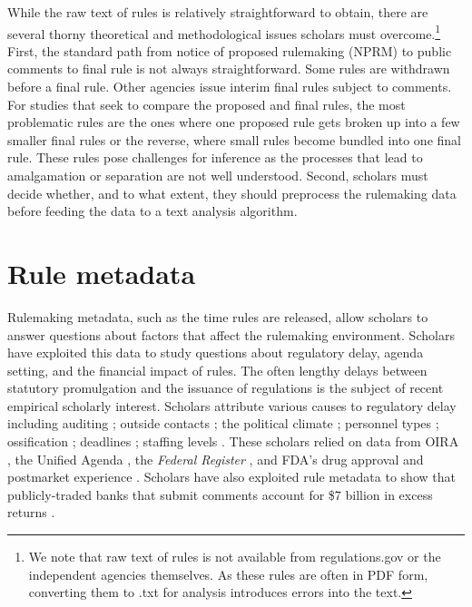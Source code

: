 \documentclass[12pt,notitlepage]{article}
\begin{document}
While the raw text of rules is relatively straightforward to obtain,
there are several thorny theoretical and methodological issues scholars
must overcome.\footnote{We note that raw text of rules is not available
  from regulations.gov or the independent agencies themselves. As these
  rules are often in PDF form, converting them to .txt for analysis
  introduces errors into the text.} First, the standard path from notice
of proposed rulemaking (NPRM) to public comments to final rule is not
always straightforward. Some rules are withdrawn before a final rule.
Other agencies issue interim final rules subject to comments. For
studies that seek to compare the proposed and final rules, the most
problematic rules are the ones where one proposed rule gets broken up
into a few smaller final rules or the reverse, where small rules become
bundled into one final rule. These rules pose challenges for inference
as the processes that lead to amalgamation or separation are not well
understood. Second, scholars must decide whether, and to what extent,
they should preprocess the rulemaking data before feeding the data to a
text analysis algorithm.

\hypertarget{rule-metadata}{%
\section{Rule metadata}\label{rule-metadata}}

Rulemaking metadata, such as the time rules are released, allow scholars
to answer questions about factors that affect the rulemaking
environment. Scholars have exploited this data to study questions about
regulatory delay, agenda setting, and the financial impact of rules. The
often lengthy delays between statutory promulgation and the issuance of
regulations is the subject of recent empirical scholarly interest.
Scholars attribute various causes to regulatory delay including auditing
\citep{ACS_PSQ_2013}; outside contacts \citep{Balla_ALR_2011}; the
political climate \citep{Potter_JOP_2017, Thrower_PSQ_2018}; personnel
types \citep{Carrigan_PAR_2019}; ossification \citep{Yackee_GWLR_2012};
deadlines
\citep{Lavertu_JPART_2012, Carpenter_AJPS_2011, Bertelli_PAR_2019};
staffing levels \citep{Bolton_JLEO_2015}. These scholars relied on data
from OIRA
\citetext{\citealp[\citet{Balla_ALR_2011}]{ACS_PSQ_2013}; \citealp{Bolton_JLEO_2015}; \citealp{Carrigan_PAR_2019}},
the Unified Agenda
\citep{Bertelli_PAR_2019, Potter_JOP_2017, Lavertu_JPART_2012, Potter_2019},
the \emph{Federal Register} \citep{Yackee_GWLR_2012, Thrower_PSQ_2018},
and FDA's drug approval and postmarket experience
\citep{Carpenter_AJPS_2011}. Scholars have also exploited rule metadata
to show that publicly-traded banks that submit comments account for \$7
billion in excess returns \citep{Libgober_2018}.
\end{document}
